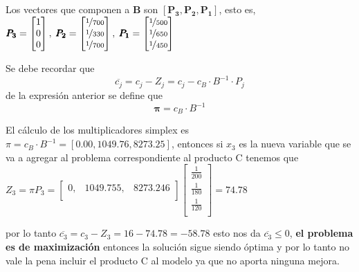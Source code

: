 \documentclass[../main.tex]{subfiles}
\begin{document}
\begin{questions}
\begin{solution}{}
Los vectores que componen a $\pmb{B}$ son $ [\pmb{P_3}, \pmb{P_2}, \pmb{P_1}]$, esto es,  $\pmb{P_3} =
\begin{bmatrix}
  1\\
  0\\
  0\\
\end{bmatrix},\;
\pmb{P_2} =
\begin{bmatrix}
  \nicefrac{1}{700}\\
  \nicefrac{1}{330}\\
  \nicefrac{1}{700}\\
\end{bmatrix},\;
\pmb{P_1} =
\begin{bmatrix}
  \nicefrac{1}{500}\\
  \nicefrac{1}{650}\\
  \nicefrac{1}{450}\\
\end{bmatrix}
$

Se debe recordar que \[ \overline{c_j} = c_j - Z_j = c_j - c_B \cdot B^{-1} \cdot P_j\] de la expresión anterior se define que \[\pmb{\pi} = c_B \cdot B^{-1} \]

El cálculo de los multiplicadores simplex es $\pi = c_B \cdot B^{-1} = \left[0.00, 1049.76, 8273.25\right]$, entonces si $x_3$ es la nueva variable que se va a agregar al problema correspondiente al producto C tenemos que
$Z_3 = \pi P_3 = \begin{bmatrix}
  0,& 1049.755,& 8273.246\\
\end{bmatrix}
\begin{bmatrix}
  \frac{1}{200}\\[2mm]
  \frac{1}{180}\\[2mm]
  \frac{1}{120}\\
\end{bmatrix}
 = 74.78
 $
 
por lo tanto $\overline{c_3} = c_3 - Z_3 = 16 - 74.78 = -58.78$ esto nos da $\overline{c_3} \leq 0$, \textbf{el problema es de maximización} entonces la solución sigue siendo óptima y por lo tanto no vale la pena incluir el producto C al modelo ya que no aporta ninguna mejora. 
\end{solution}


\end{questions}
\end{document}
